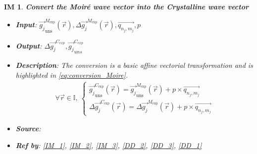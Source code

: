 \documentclass[12pt]{article}
\newtheorem{IM}{IM}
\begin{document}
\begin{IM}
\label{IM_4}
\noindent\colorbox{shadecolorIM}{\normalfont \textbf{Convert the Moir{\'e} wave vector into the Crystalline wave vector}}
\normalfont
\begin{itemize}
\item \textbf{Input}: $\overrightarrow{g_{j}}_{\text{uns}}^{M_{\text{exp}}}(\vec{r}),\Delta \overrightarrow{g_{j}}^{M_{\text{exp}}}(\vec{r}),\overrightarrow{q_{n_j,m_j}},p$
\item \textbf{Output}: $\Delta \overrightarrow{g_{j}}^{C_{exp}},\overrightarrow{g_{j}}_{uns}^{C_{exp}}$
\item \textbf{Description}: The conversion is a basic affine vectorial transformation and is highlighted in \cref{eq:conversion_Moire}.
\begin{equation}
\label{eq:conversion_Moire}
\begin{gathered}
\forall \vec{r} \in \mathbb{I}, \ \begin{cases}
\overrightarrow{g_{j}}_{\text{uns}}^{C_{\text{exp}}}(\vec{r})= \overrightarrow{g_{j}}_{\text{uns}}^{M_{\text{exp}}}(\vec{r}) + p \times \overrightarrow{q_{n_j,m_j}} \\
\Delta \overrightarrow{g_{j}}^{C_{\text{exp}}}(\vec{r})= \Delta \overrightarrow{g_{j}}^{M_{\text{exp}}}(\vec{r}) + p \times \overrightarrow{q_{n_j,m_j}}
\end{cases}
\end{gathered}
\end{equation}
\item \textbf{Source}: \cite{Pofelski2017}
\item \textbf{Ref by}: \cref{IM_1}, \cref{IM_2}, \cref{IM_3}, \cref{DD_2}, \cref{DD_3}, \cref{DD_1}
\end{itemize}
\end{IM}
\end{document}
